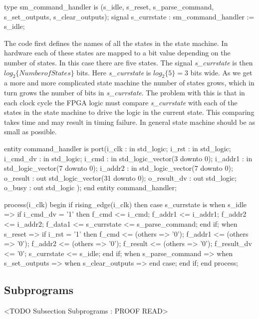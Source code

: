 \begin{VHDLlisting}[tabsize=4]
type sm_command_handler is (s_idle, s_reset, s_parse_command, s_set_outputs, s_clear_outputs);
signal s_currstate : sm_command_handler := s_idle;
\end{VHDLlisting}

The code first defines the names of all the states in the state machine. In hardware each of these states are mapped to a bit value depending on the number of states. In this case there are five states. The signal \emph{s\_currstate} is then $log_2\{{Number of States}\}$ bits. Here \emph{s\_currstate} is $log_2\{5\}=3$ bits wide. As we get a more and more complicated state machine the number of states grows, which in turn grows the number of bits in \emph{s\_currstate}. The problem with this is that in each clock cycle the \ac{FPGA} logic must compare \emph{s\_currstate} with each of the states in the state machine to drive the logic in the current state. This comparing takes time and may result in timing failure. In general state machine should be as small as possible.

\begin{VHDLlisting}[tabsize=4]
entity command_handler is
port(i_clk       : in    std_logic;
	 i_rst       : in    std_logic;
	 i_cmd_dv    : in    std_logic;
	 i_cmd       : in    std_logic_vector(3 downto 0);
	 i_addr1     : in    std_logic_vector(7 downto 0);
	 i_addr2     : in    std_logic_vector(7 downto 0);
	 o_result    :   out std_logic_vector(31 downto 0);
	 o_result_dv :   out std_logic;
	 o_busy      :   out std_logic
);
end entity command_handler;
\end{VHDLlisting}


\begin{VHDLlisting}[tabsize=4]
process(i_clk)
begin
	if rising_edge(i_clk) then
		case s_currstate is
			when s_idle => 
				if i_cmd_dv = '1' then
					f_cmd    <= i_cmd;
					f_addr1  <= i_addr1;
					f_addr2  <= i_addr2;
					f_data1  <= 
					s_currstate <= s_parse_command;
				end if;
			when s_reset => 
				if i_rst = '1' then
					f_cmd <= (others => '0');
					f_addr1 <= (others => '0');
					f_addr2 <= (others => '0');
					f_result <= (others => '0');
					f_result_dv <= '0';
					s_currstate <= s_idle;
				end if;
			when s_parse_command => 
			when s_set_outputs => 
			when s_clear_outputs => 
		end case;
	end if;
end process;
\end{VHDLlisting}
 

\subsection{Subprograms}
	<TODO Subsection Subprograms : PROOF READ>

